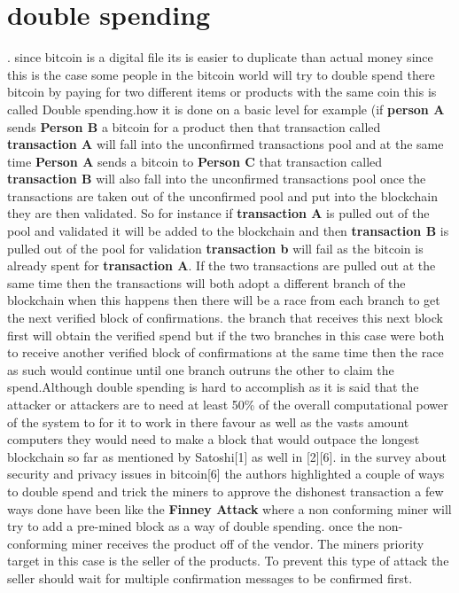 \documentclass[report]{IEEEtran}
\begin{document}
\section{double spending}.\newline
since bitcoin is a digital file its is easier to duplicate than actual money since this is the case some people in the bitcoin world will try to double spend there bitcoin by paying for two different items or products with the same coin this is called Double spending.how it is done on a basic level for example (if \textbf{person A} sends \textbf{Person B} a bitcoin for a product then that transaction called \textbf{transaction A} will fall into the unconfirmed transactions pool and at the same time \textbf{Person A} sends a bitcoin to \textbf{Person C} that transaction called \textbf{transaction B} will also fall into the unconfirmed transactions pool once the transactions are taken out of the unconfirmed pool and put into the blockchain they are then validated. So for instance if \textbf{transaction A} is pulled out of the pool and validated it will be added to the blockchain and then \textbf{transaction B} is pulled out of the pool for validation \textbf{transaction b} will fail as the bitcoin is already spent for \textbf{transaction A}. If the two transactions are pulled out at the same time then the transactions will both adopt a different branch of the blockchain when this happens then there will be a race from each branch to get the next verified block of confirmations. the branch that receives this next block first will obtain the verified spend but if the two branches in this case were both to receive another verified block of confirmations at the same time then the race as such would continue until one branch outruns the other to claim the spend.Although double spending is hard to    
accomplish as it is said that the attacker or attackers are to need at least 50\% of the overall computational power of the system to for it to work in there favour as well as the vasts amount computers they would need to make a block that would outpace the longest blockchain so far as mentioned by Satoshi[1] as well in [2][6]. in the survey about security and privacy issues in bitcoin[6] the authors highlighted a couple of ways to double spend and trick the miners to approve the dishonest transaction a few ways done have been like the \textbf{Finney Attack} where a non conforming miner  will try to add a pre-mined block as a way of double spending. once the non-conforming miner receives the product off of the vendor. The miners priority target in this case is the seller of the products. To prevent this type of attack the seller should wait for multiple confirmation messages to be confirmed first.
\end{document}
